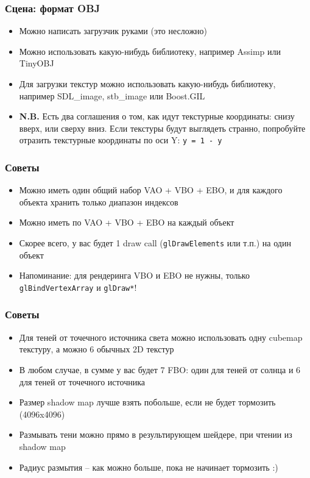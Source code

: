 \documentclass{beamer}
\begin{document}
\begin{frame}[fragile]
\frametitle{Сцена: формат OBJ}
\begin{itemize}
\item Можно написать загрузчик руками (это несложно)
\item Можно использовать какую-нибудь библиотеку, например Assimp или TinyOBJ
\item Для загрузки текстур можно использовать какую-нибудь библиотеку, например SDL\_image, stb\_image или Boost.GIL
\item \textbf{N.B.} Есть два соглашения о том, как идут текстурные координаты: снизу вверх, или сверху вниз. Если текстуры будут выглядеть странно, попробуйте отразить текстурные координаты по оси Y: \verb|y = 1 - y|
\end{itemize}
\end{frame}

\begin{frame}[fragile]
\frametitle{Советы}
\begin{itemize}
\item Можно иметь один общий набор VAO + VBO + EBO, и для каждого объекта хранить только диапазон индексов
\item Можно иметь по VAO + VBO + EBO на каждый объект
\item Скорее всего, у вас будет 1 draw call (\verb|glDrawElements| или т.п.) на один объект
\item Напоминание: для рендеринга VBO и EBO не нужны, только \verb|glBindVertexArray| и \verb|glDraw*|!
\end{itemize}
\end{frame}

\begin{frame}[fragile]
\frametitle{Советы}
\begin{itemize}
\item Для теней от точечного источника света можно использовать одну cubemap текстуру, а можно 6 обычных 2D текстур
\item В любом случае, в сумме у вас будет 7 FBO: один для теней от солнца и 6 для теней от точечного источника
\item Размер shadow map лучше взять побольше, если не будет тормозить (4096x4096)
\item Размывать тени можно прямо в результирующем шейдере, при чтении из shadow map
\item Радиус размытия -- как можно больше, пока не начинает тормозить :)
\end{itemize}
\end{frame}
\end{document}
